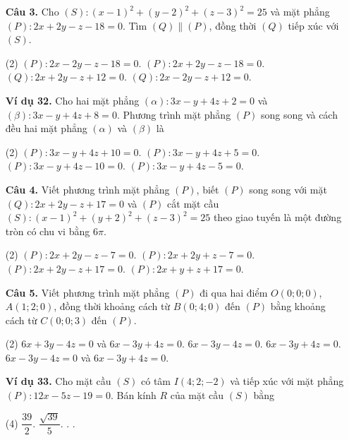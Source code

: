 \documentclass[12pt, a4paper]{article}
\begin{document}
\begin{enumerate}[label=\textbf{\arabic*.}, wide=0pt, leftmargin=*]
    \item[\textbf{Câu 3.}] Cho \((S): (x-1)^2+(y-2)^2+(z-3)^2 = 25\) và mặt phẳng \((P): 2x+2y-z-18=0\). Tìm \((Q)\parallel(P)\), đồng thời \((Q)\) tiếp xúc với \((S)\).
    \begin{tasks}(2)
        \task \((P): 2x-2y-z-18=0\).
        \task \((P): 2x+2y-z-18=0\).
        \task \((Q): 2x+2y-z+12=0\).
        \task \((Q): 2x-2y-z+12=0\).
    \end{tasks}
    
    \item[\textbf{Ví dụ 32.}] Cho hai mặt phẳng \((\alpha): 3x-y+4z+2=0\) và \((\beta): 3x-y+4z+8=0\). Phương trình mặt phẳng \((P)\) song song và cách đều hai mặt phẳng \((\alpha)\) và \((\beta)\) là
    \begin{tasks}(2)
        \task \((P): 3x-y+4z+10=0\).
        \task \((P): 3x-y+4z+5=0\).
        \task \((P): 3x-y+4z-10=0\).
        \task \((P): 3x-y+4z-5=0\).
    \end{tasks}
    
    \item[\textbf{Câu 4.}] Viết phương trình mặt phẳng \((P)\), biết \((P)\) song song với mặt \((Q): 2x+2y-z+17=0\) và \((P)\) cắt mặt cầu \((S): (x-1)^2+(y+2)^2+(z-3)^2=25\) theo giao tuyến là một đường tròn có chu vi bằng \(6\pi\).
    \begin{tasks}(2)
        \task \((P): 2x+2y-z-7=0\).
        \task \((P): 2x+2y+z-7=0\).
        \task \((P): 2x+2y-z+17=0\).
        \task \((P): 2x+y+z+17=0\).
    \end{tasks}
    
    \item[\textbf{Câu 5.}] Viết phương trình mặt phẳng \((P)\) đi qua hai điểm \(O(0;0;0)\), \(A(1;2;0)\), đồng thời khoảng cách từ \(B(0;4;0)\) đến \((P)\) bằng khoảng cách từ \(C(0;0;3)\) đến \((P)\).
    \begin{tasks}(2)
        \task \(6x+3y-4z=0\) và \(6x-3y+4z=0\).
        \task \(6x-3y-4z=0\).
        \task \(6x-3y+4z=0\).
        \task \(6x-3y-4z=0\) và \(6x-3y+4z=0\).
    \end{tasks}

    \item[\textbf{Ví dụ 33.}] Cho mặt cầu \((S)\) có tâm \(I(4;2;-2)\) và tiếp xúc với mặt phẳng \((P): 12x-5z-19=0\). Bán kính \(R\) của mặt cầu \((S)\) bằng
    \begin{tasks}(4)
        \task \(\dfrac{39}{2}\).
        \task \(\dfrac{\sqrt{39}}{5}\).
        .
        .
    \end{tasks}
    

\end{enumerate}
\end{document}
